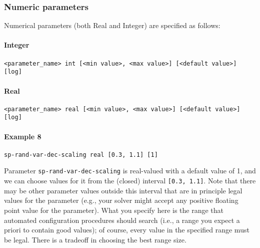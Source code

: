 \documentclass[manual.tex]{subfiles}
\begin{document}
\subsubsection*{Numeric parameters} \label{sec:numerical-params}
Numerical parameters (both Real and Integer) are specified as follows:

\paragraph{Integer}

\begin{verbatim}
<parameter_name> int [<min value>, <max value>] [<default value>] [log]
\end{verbatim}

\paragraph{Real}

\begin{verbatim}
<parameter_name> real [<min value>, <max value>] [<default value>] [log]
\end{verbatim}



\paragraph{Example 8}

\begin{verbatim}
sp-rand-var-dec-scaling real [0.3, 1.1] [1]
\end{verbatim}
Parameter \texttt{sp-rand-var-dec-scaling} is real-valued with a default value of 1, and we can choose values for it from the (closed) interval \texttt{[0.3, 1.1]}.
Note that there may be other parameter values outside this interval that are in principle legal values for the parameter (e.g., your solver might accept any positive floating point value for the parameter). What you specify here is the range that automated configuration procedures should search (i.e., a range you expect a priori to contain good values); of course, every value in the specified range must be legal. There is a tradeoff in choosing the best range size.%
\end{document}
